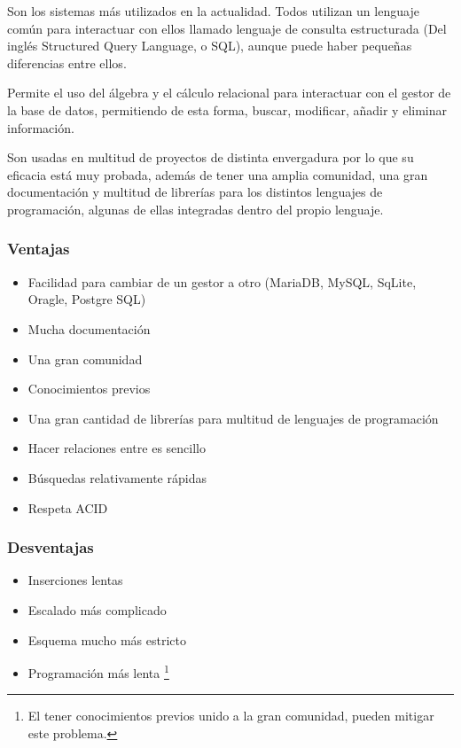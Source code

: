Son los sistemas más utilizados en la actualidad. Todos utilizan un lenguaje común para interactuar con ellos llamado lenguaje de consulta estructurada (Del inglés Structured Query Language, o SQL), aunque puede haber pequeñas diferencias entre ellos. 

Permite el uso del álgebra y el cálculo relacional para interactuar con el gestor de la base de datos, permitiendo de esta forma, buscar, modificar, añadir y eliminar información. 

Son usadas en multitud de proyectos de distinta envergadura por lo que su eficacia está muy probada, además de tener una amplia comunidad, una gran documentación y multitud de librerías para los distintos lenguajes de programación, algunas de ellas integradas dentro del propio lenguaje. 

\subsubsection{Ventajas}
\begin{itemize}
    \item Facilidad para cambiar de un gestor a otro (MariaDB, MySQL, SqLite, Oragle, Postgre SQL)
    \item Mucha documentación
    \item Una gran comunidad
    \item Conocimientos previos
    \item Una gran cantidad de librerías para multitud de lenguajes de programación
    \item Hacer relaciones entre es sencillo
    \item Búsquedas relativamente rápidas
    \item Respeta ACID
\end{itemize}

\subsubsection{Desventajas}
\begin{itemize}
    \item Inserciones lentas
    \item Escalado más complicado
    \item Esquema mucho más estricto
    \item Programación más lenta \footnote{El tener conocimientos previos unido a la gran comunidad, pueden mitigar este problema.}
\end{itemize}

